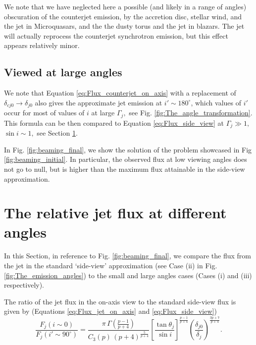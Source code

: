 We note that we have neglected here a possible (and likely in a range of angles) obscuration of the counterjet emission, by the accretion disc, stellar wind, and the jet in Microquasars, and the the dusty torus and the jet in blazars. The jet will actually reprocess the counterjet synchrotron emission, but this effect appears relatively minor.



\subsection{Viewed at large angles}

We note that Equation \ref{eq:Flux_counterjet_on_axis} with a replacement of $ \delta_{cj0} \rightarrow \delta_{j0} $ also gives the approximate jet emission at $ i' \sim 180 ^{\circ} $, which values of $ i' $ occur for most of values of $ i $ at large $ \Gamma_j , $ see Fig. \ref{fig:The_angle_transformation}. This formula can be then compared to Equation \ref{eq:Flux_side_view} at $ \Gamma_j \gg 1 , $ $ \sin i\sim 1 , $ see Section \ref{sec:comparison}.

In Fig. \ref{fig:beaming_final}, we show the solution of the problem showcased in Fig \ref{fig:beaming_initial}. In particular, the observed flux at low viewing angles does not go to null, but is higher than the maximum flux attainable in the side-view approximation.






\section{The relative jet flux at different angles} \label{sec:comparison}

In this Section, in reference to Fig. \ref{fig:beaming_final}, we compare the flux from the jet in the standard `side-view' approximation (see Case (ii) in Fig. \ref{fig:The_emission_angles}) to the small and large angles cases (Cases (i) and (iii) respectively).

The ratio of the jet flux in the on-axis view to the standard side-view flux is given by (Equations \ref{eq:Flux_jet_on_axis} and \ref{eq:Flux_side_view})
\begin{equation}
\frac{F_j (i \sim 0)}{F_j (i' \sim 90^{\circ})} = \dfrac{ \pi \, \Gamma \left( \frac{p-1}{p+4} \right) }{ C_3(p) \, (p+4)^{\frac{5}{p+4}} } \left[ \frac{\tan \theta_j}{\sin i} \right]^{ \frac{p-1}{p+4} } \left( \frac{\delta_{j0}}{\delta_j} \right)^{ \frac{3p+7}{p+4} }.
\end{equation}

